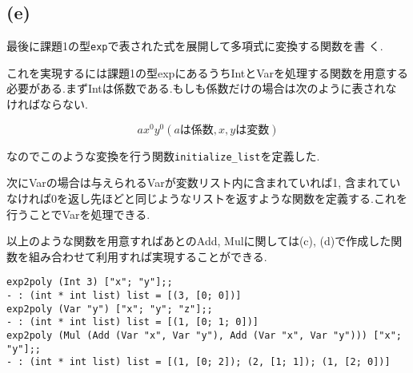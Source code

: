 \documentclass[11pt,a4j]{jarticle}
\begin{document}
\subsection*{(e)}
最後に課題1の型\verb|exp|で表された式を展開して多項式に変換する関数を書
く.

これを実現するには課題1の型expにあるうちIntとVarを処理する関数を用意する
必要がある.まずIntは係数である.もしも係数だけの場合は次のように表されな
ければならない.

\[ax^0y^0 (aは係数,x,yは変数)\]

なのでこのような変換を行う関数\verb|initialize_list|を定義した.

次にVarの場合は与えられるVarが変数リスト内に含まれていれば1, 含まれてい
なければ0を返し先ほどと同じようなリストを返すような関数を定義する.これを
行うことでVarを処理できる.

以上のような関数を用意すればあとのAdd, Mulに関しては(c), (d)で作成した関
数を組み合わせて利用すれば実現することができる.
\begin{lstlisting}[caption=実行結果]
exp2poly (Int 3) ["x"; "y"];;
- : (int * int list) list = [(3, [0; 0])]
exp2poly (Var "y") ["x"; "y"; "z"];;
- : (int * int list) list = [(1, [0; 1; 0])]
exp2poly (Mul (Add (Var "x", Var "y"), Add (Var "x", Var "y"))) ["x"; "y"];;
- : (int * int list) list = [(1, [0; 2]); (2, [1; 1]); (1, [2; 0])]
\end{lstlisting}
\end{document}
